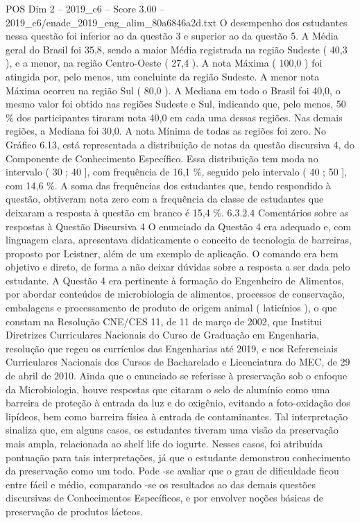 \begin{textsample}{POS Dim 2 – 2019\_c6 – Score 3.00 – 2019\_c6/enade\_2019\_eng\_alim\_80a6846a2d.txt}
O desempenho dos estudantes nessa questão foi inferior ao da questão 3 e superior ao da questão 5.
A Média geral do Brasil foi 35,8, sendo a maior Média registrada na região Sudeste ( 40,3 ), e a menor, na região Centro-Oeste ( 27,4 ).
A nota Máxima ( 100,0 ) foi atingida por, pelo menos, um concluinte da região Sudeste.
A menor nota Máxima ocorreu na região Sul ( 80,0 ).
A Mediana em todo o Brasil foi 40,0, o mesmo valor foi obtido nas regiões Sudeste e Sul, indicando que, pelo menos, 50 \% dos participantes tiraram nota 40,0 em cada uma dessas regiões.
Nas demais regiões, a Mediana foi 30,0.
A nota Mínima de todas as regiões foi zero.
No Gráfico 6.13, está representada a distribuição de notas da questão discursiva 4, do Componente de Conhecimento Específico.
Essa distribuição tem moda no intervalo ( 30 ; 40 ], com frequência de 16,1 \%, seguido pelo intervalo ( 40 ; 50 ], com 14,6 \%.
A soma das frequências dos estudantes que, tendo respondido à questão, obtiveram nota zero com a frequência da classe de estudantes que deixaram a resposta à questão em branco é 15,4 \%. 6.3.2.4 Comentários sobre as respostas à Questão Discursiva 4 O enunciado da Questão 4 era adequado e, com linguagem clara, apresentava didaticamente o conceito de tecnologia de barreiras, proposto por Leistner, além de um exemplo de aplicação.
O comando era bem objetivo e direto, de forma a não deixar dúvidas sobre a resposta a ser dada pelo estudante.
A Questão 4 era pertinente à formação do Engenheiro de Alimentos, por abordar conteúdos de microbiologia de alimentos, processos de conservação, embalagens e processamento de produto de origem animal ( laticínios ), o que constam na Resolução CNE/CES 11, de 11 de março de 2002, que Institui Diretrizes Curriculares Nacionais do Curso de Graduação em Engenharia, resolução que regeu os currículos das Engenharias até 2019, e nos Referenciais Curriculares Nacionais dos Cursos de Bacharelado e Licenciatura do MEC, de 29 de abril de 2010.
Ainda que o enunciado se referisse à preservação sob o enfoque da Microbiologia, houve respostas que citaram o selo de alumínio como uma barreira de proteção à entrada da luz e do oxigênio, evitando a foto-oxidação dos lipídeos, bem como barreira física à entrada de contaminantes.
Tal interpretação sinaliza que, em alguns casos, os estudantes tiveram uma visão da preservação mais ampla, relacionada ao shelf life do iogurte.
Nesses casos, foi atribuída pontuação para tais interpretações, já que o estudante demonstrou conhecimento da preservação como um todo.
Pode -se avaliar que o grau de dificuldade ficou entre fácil e médio, comparando -se os resultados ao das demais questões discursivas de Conhecimentos Específicos, e por envolver noções básicas de preservação de produtos lácteos.

\end{textsample}
